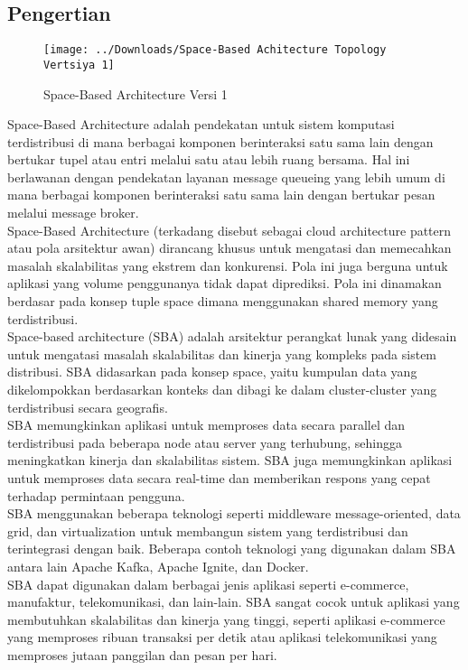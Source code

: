\documentclass[a4paper]{report}
\begin{document}
	\subsection*{\LARGE{Pengertian}}
	\begin{figure}
		\centering
		\texttt{[image: ../Downloads/Space-Based Achitecture Topology Vertsiya 1]}
		\caption{Space-Based Architecture Versi 1}
	\end{figure}
	\large Space-Based Architecture adalah pendekatan untuk sistem komputasi terdistribusi di mana berbagai komponen berinteraksi satu sama lain dengan bertukar tupel atau entri melalui satu atau lebih ruang bersama. Hal ini berlawanan dengan pendekatan layanan message queueing yang lebih umum di mana berbagai komponen berinteraksi satu sama lain dengan bertukar pesan melalui message broker.\\
	
	Space-Based Architecture (terkadang disebut sebagai cloud architecture pattern atau pola arsitektur awan) dirancang khusus untuk mengatasi dan memecahkan masalah skalabilitas yang ekstrem dan konkurensi. Pola ini juga berguna untuk aplikasi yang volume penggunanya tidak dapat diprediksi. Pola ini dinamakan berdasar pada konsep tuple space dimana menggunakan shared memory yang terdistribusi.\\
	
	Space-based architecture (SBA) adalah arsitektur perangkat lunak yang didesain untuk mengatasi masalah skalabilitas dan kinerja yang kompleks pada sistem distribusi. SBA didasarkan pada konsep space, yaitu kumpulan data yang dikelompokkan berdasarkan konteks dan dibagi ke dalam cluster-cluster yang terdistribusi secara geografis.\\
	
	SBA memungkinkan aplikasi untuk memproses data secara parallel dan terdistribusi pada beberapa node atau server yang terhubung, sehingga meningkatkan kinerja dan skalabilitas sistem. SBA juga memungkinkan aplikasi untuk memproses data secara real-time dan memberikan respons yang cepat terhadap permintaan pengguna.\\
	
	SBA menggunakan beberapa teknologi seperti middleware message-oriented, data grid, dan virtualization untuk membangun sistem yang terdistribusi dan terintegrasi dengan baik. Beberapa contoh teknologi yang digunakan dalam SBA antara lain Apache Kafka, Apache Ignite, dan Docker.\\
	
	SBA dapat digunakan dalam berbagai jenis aplikasi seperti e-commerce, manufaktur, telekomunikasi, dan lain-lain. SBA sangat cocok untuk aplikasi yang membutuhkan skalabilitas dan kinerja yang tinggi, seperti aplikasi e-commerce yang memproses ribuan transaksi per detik atau aplikasi telekomunikasi yang memproses jutaan panggilan dan pesan per hari.\\
	
\end{document}
